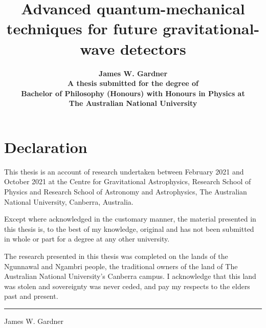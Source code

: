 \documentclass[onecolumn,12pt,a4paper,openany,oneside]{book}
\begin{document}

\begin{titlepage}
\title{ \textbf{Advanced quantum-mechanical techniques for future gravitational-wave detectors}\\[2cm]}
\author{\textbf{James W. Gardner}\\[6cm]
\textbf{A thesis submitted for the degree of}\\
\textbf{Bachelor of Philosophy (Honours) with Honours in Physics at} \\
\textbf{The Australian National University}\\[1cm]}
\date{\textbf{\thismonth}}
\maketitle
\end{titlepage}
 
\sloppy


\chapter*{Declaration}

This thesis is an account of research undertaken between February 2021 and October 2021 at the Centre for Gravitational Astrophysics, Research School of Physics and Research School of Astronomy and Astrophysics, The Australian National University, Canberra, Australia.

Except where acknowledged in the customary manner, the material presented in this thesis is, to the best of my knowledge, original and has not been submitted in whole or part for a degree at any other university.

The research presented in this thesis was completed on the lands of the Ngunnawal and Ngambri people, the traditional owners of the land of The Australian National University's Canberra campus. I acknowledge that this land was stolen and sovereignty was never ceded, and pay my respects to the elders past and present.

\vspace{20mm}
\hspace{80mm}\rule{40mm}{.15mm}\par
\hspace{80mm} James W. Gardner\par
\hspace{80mm} \thismonth
\end{document}

